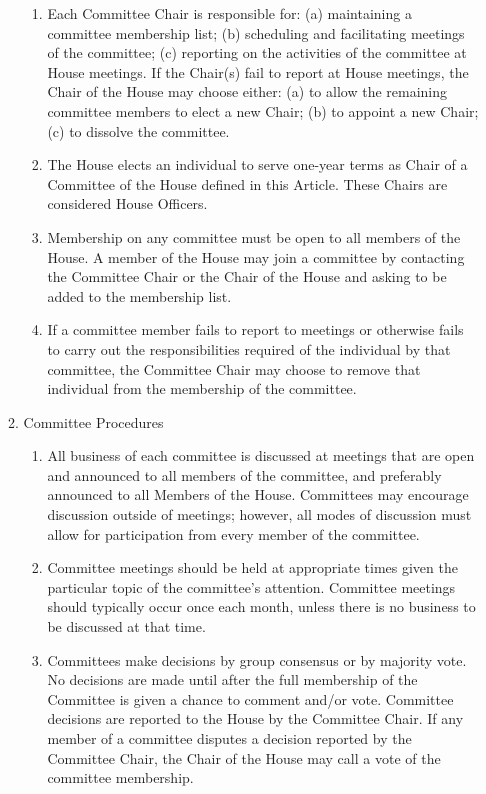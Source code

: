 \documentclass[letterpaper]{article}
\begin{document}
\begin{enumerate}
\begin{enumerate}
\begin{enumerate}
\item Each Committee Chair is responsible for: (a) maintaining a committee membership list; (b) scheduling and facilitating meetings of the committee; (c) reporting on the activities of the committee at House meetings. If the Chair(s) fail to report at House meetings, the Chair of the House may choose either: (a) to allow the remaining committee members to elect a new Chair; (b) to appoint a new Chair; (c) to dissolve the committee.

\item The House elects an individual to serve one-year terms as Chair of a Committee of the House defined in this Article. These Chairs are considered House Officers.

\item Membership on any committee must be open to all members of the House. A member of the House may join a committee by contacting the Committee Chair or the Chair of the House and asking to be added to the membership list.

\item If a committee member fails to report to meetings or otherwise fails to carry out the responsibilities required of the individual by that committee, the Committee Chair may choose to remove that individual from the membership of the committee.

\end{enumerate}

\item Committee Procedures

\begin{enumerate}

\item All business of each committee is discussed at meetings that are open and announced to all members of the committee, and preferably announced to all Members of the House. Committees may encourage discussion outside of meetings; however, all modes of discussion must allow for participation from every member of the committee.

\item Committee meetings should be held at appropriate times given the particular topic of the committee's attention. Committee meetings should typically occur once each month, unless there is no business to be discussed at that time.

\item Committees make decisions by group consensus or by majority vote. No decisions are made until after the full membership of the Committee is given a chance to comment and/or vote. Committee decisions are reported to the House by the Committee Chair. If any member of a committee disputes a decision reported by the Committee Chair, the Chair of the House may call a vote of the committee membership.


\end{enumerate}
\end{enumerate}
\end{enumerate}
\end{document}
